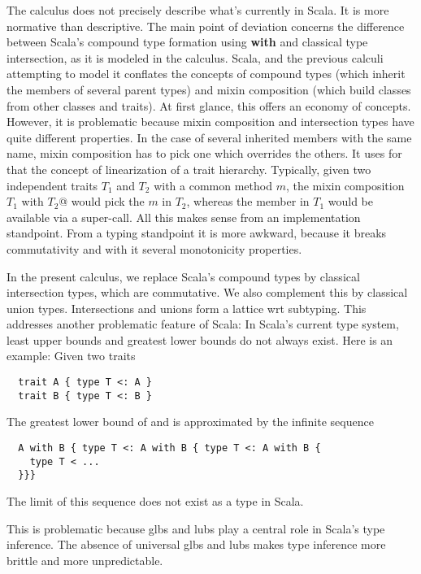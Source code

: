 \documentclass[9pt]{sigplanconf}
\begin{document}
The calculus does not precisely describe what's currently in Scala. It
is more normative than descriptive. The main point of deviation
concerns the difference between Scala's compound type formation using
{\bf with} and classical type intersection, as it is modeled in the
calculus. Scala, and the previous calculi attempting to model it
conflates the concepts of compound types (which inherit the members of
several parent types) and mixin composition (which build classes from
other classes and traits). At first glance, this offers an economy of
concepts. However, it is problematic because mixin composition and
intersection types have quite different properties. In the case of
several inherited members with the same name, mixin composition has to
pick one which overrides the others. It uses for that the concept of
linearization of a trait hierarchy. Typically, given two independent
traits $T_1$ and $T_2$ with a common method $m$, the mixin composition
\code@$T_1$ with $T_2$@ would pick the $m$ in $T_2$, whereas the member in
$T_1$ would be available via a super-call. All this makes sense from
an implementation standpoint. From a typing standpoint it is more
awkward, because it breaks commutativity and with it several
monotonicity properties.

In the present calculus, we replace Scala's compound types by
classical intersection types, which are commutative. We also
complement this by classical union types. Intersections and unions
form a lattice wrt subtyping. This addresses another problematic
feature of Scala: In Scala's current type system, least upper bounds
and greatest lower bounds do not always exist. Here is an example:
Given two traits
\begin{lstlisting}
  trait A { type T <: A }
  trait B { type T <: B }
\end{lstlisting}
The greatest lower bound of \code@A@ and \code@B@ is approximated by the
infinite sequence
\begin{lstlisting}
  A with B { type T <: A with B { type T <: A with B {
    type T < ...
  }}}
\end{lstlisting}
The limit of this sequence does not exist as a type in Scala.

This is problematic because glbs and lubs play a central role in
Scala's type inference. The absence of universal glbs and lubs makes
type inference more brittle and more unpredictable.

\end{document}
